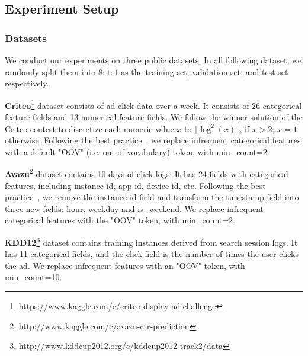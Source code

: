 \documentclass[sigconf]{acmart}
\begin{document}
\subsection{Experiment Setup}
\subsubsection{Datasets}

We conduct our experiments on three public datasets. In all following dataset, we randomly split them into $8:1:1$ as the training set, validation set, and test set respectively. 


\textbf{Criteo}\footnote{https://www.kaggle.com/c/criteo-display-ad-challenge} dataset consists of ad click data over a week. It consists of 26 categorical feature fields and 13 numerical feature fields. We follow the winner solution of the Criteo contest to discretize each numeric value $x$ to $\lfloor\log^2(x)\rfloor$, if $x>2$; $x=1$ otherwise. Following the best practice~\cite{fuxictr}, we replace infrequent categorical features with a default "OOV" (i.e. out-of-vocabulary) token, with min\_count=2.

\textbf{Avazu}\footnote{http://www.kaggle.com/c/avazu-ctr-prediction} dataset contains 10 days of click logs. It has 24 fields with categorical features, including instance id, app id, device id, etc. Following the best practice~\cite{fuxictr}, we remove the instance id field and transform the timestamp field into three new fields: hour, weekday and is\_weekend. We replace infrequent categorical features with the "OOV" token, with min\_count=2.

\textbf{KDD12}\footnote{http://www.kddcup2012.org/c/kddcup2012-track2/data} dataset contains training instances derived from search session logs. It has 11 categorical fields, and the click field is the number of times the user clicks the ad. We replace infrequent features with an "OOV" token, with min\_count=10.
\end{document}
